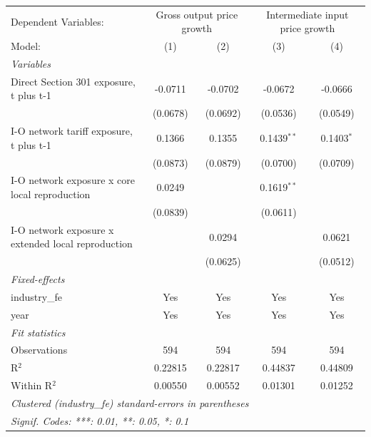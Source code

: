 \begingroup
\centering
\begin{tabular}{lcccc}
   \tabularnewline \midrule \midrule
   Dependent Variables: & \multicolumn{2}{c}{Gross output price growth} & \multicolumn{2}{c}{Intermediate input price growth}\\
   Model:                                             & (1)      & (2)      & (3)           & (4)\\  
   \midrule
   \emph{Variables}\\
   Direct Section 301 exposure, t plus t-1            & -0.0711  & -0.0702  & -0.0672       & -0.0666\\   
                                                      & (0.0678) & (0.0692) & (0.0536)      & (0.0549)\\   
   I-O network tariff exposure, t plus t-1            & 0.1366   & 0.1355   & 0.1439$^{**}$ & 0.1403$^{*}$\\   
                                                      & (0.0873) & (0.0879) & (0.0700)      & (0.0709)\\   
   I-O network exposure x core local reproduction     & 0.0249   &          & 0.1619$^{**}$ &   \\   
                                                      & (0.0839) &          & (0.0611)      &   \\   
   I-O network exposure x extended local reproduction &          & 0.0294   &               & 0.0621\\   
                                                      &          & (0.0625) &               & (0.0512)\\   
   \midrule
   \emph{Fixed-effects}\\
   industry\_fe                                       & Yes      & Yes      & Yes           & Yes\\  
   year                                               & Yes      & Yes      & Yes           & Yes\\  
   \midrule
   \emph{Fit statistics}\\
   Observations                                       & 594      & 594      & 594           & 594\\  
   R$^2$                                              & 0.22815  & 0.22817  & 0.44837       & 0.44809\\  
   Within R$^2$                                       & 0.00550  & 0.00552  & 0.01301       & 0.01252\\  
   \midrule \midrule
   \multicolumn{5}{l}{\emph{Clustered (industry\_fe) standard-errors in parentheses}}\\
   \multicolumn{5}{l}{\emph{Signif. Codes: ***: 0.01, **: 0.05, *: 0.1}}\\
\end{tabular}
\par\endgroup
